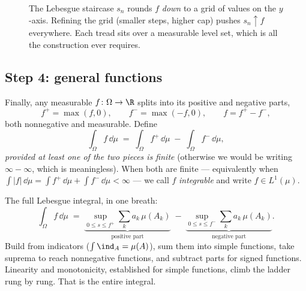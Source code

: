 \begin{figure}[H]
\centering
{}
\caption{The Lebesgue staircase $s_n$ rounds $f$ \emph{down} to a grid of values
on the $y$-axis. Refining the grid (smaller steps, higher cap) pushes
$s_n\uparrow f$ everywhere. Each tread sits over a measurable level set, which is
all the construction ever requires.}
\label{ch37:fig-staircase}
\end{figure}

\subsection{Step 4: general functions}

Finally, any measurable $f\colon\Omega\to\R$ splits into its positive and
negative parts,
\[
  f^+ = \max(f,0), \qquad f^- = \max(-f,0), \qquad f = f^+ - f^-,
\]
both nonnegative and measurable. Define
\[
  \int_\Omega f\,\dd\mu \;=\; \int_\Omega f^+\,\dd\mu \;-\; \int_\Omega
  f^-\,\dd\mu,
\]
\emph{provided at least one of the two pieces is finite} (otherwise we would be
writing $\infty-\infty$, which is meaningless). When both are finite ---
equivalently when $\int |f|\,\dd\mu = \int f^+\,\dd\mu + \int f^-\,\dd\mu <
\infty$ --- we call $f$ \emph{integrable} and write $f\in L^1(\mu)$.

\begin{formalbox}
The full Lebesgue integral, in one breath:
\[
  \int_\Omega f\,\dd\mu
  \;=\; \underbrace{\sup_{0\le s\le f^+}\sum_k a_k\,\mu(A_k)}_{\text{positive part}}
  \;-\; \underbrace{\sup_{0\le s\le f^-}\sum_k a_k\,\mu(A_k)}_{\text{negative part}} .
\]
Build from indicators ($\int\ind_A=\mu(A)$), sum them into simple functions,
take suprema to reach nonnegative functions, and subtract parts for signed
functions. Linearity and monotonicity, established for simple functions, climb
the ladder rung by rung. That is the entire integral.
\end{formalbox}

